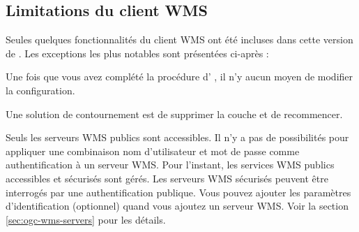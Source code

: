 \subsection{Limitations du client
WMS}\label{sec:ogc-wms-limits}

Seules quelques fonctionnalités du client WMS ont été incluses dans cette
version de \qg. Les exceptions les plus notables sont présentées ci-après :


Une fois que vous avez complété la procédure d'
, il n'y aucun moyen
de modifier la configuration.

Une solution de contournement est de supprimer la couche et de recommencer.


Seuls les serveurs WMS publics sont accessibles.
Il n'y a pas de possibilités pour appliquer une combinaison nom d'utilisateur
et mot de passe comme authentification à un serveur WMS.
Pour l'instant, les services WMS publics accessibles et sécurisés sont gérés.
Les serveurs WMS sécurisés peuvent être interrogés par une authentification publique. Vous pouvez 
ajouter les paramètres d'identification (optionnel) quand vous ajoutez un serveur WMS. Voir la section 
\ref{sec:ogc-wms-servers} pour les détails.


